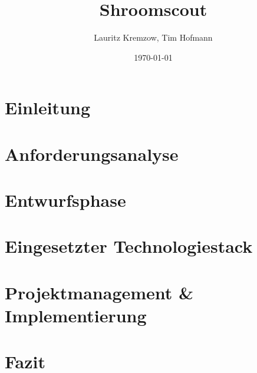 \documentclass{article}
\title{Shroomscout}
\author{Lauritz Kremzow, Tim Hofmann}
\date{\today}
\begin{document}
\begin{titlepage}
	\maketitle
\end{titlepage}

\tableofcontents

\newpage

\section{Einleitung}


\section{Anforderungsanalyse}


\section{Entwurfsphase}


\section{Eingesetzter Technologiestack}


\section{Projektmanagement \& Implementierung}


\section{Fazit}

\end{document}
